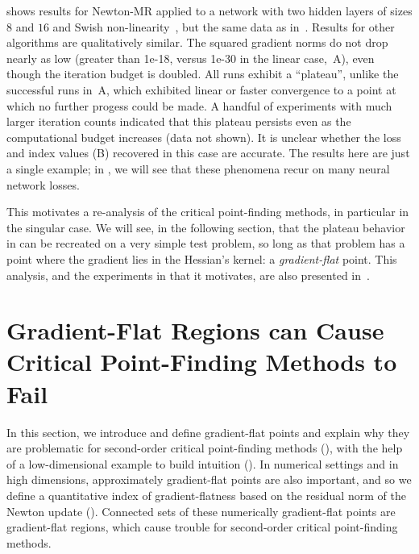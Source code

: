 \documentclass[../../thesis.tex]{subfiles}
\begin{document}
 shows
results for Newton-MR applied to
a network with two hidden layers of sizes $8$ and $16$
and Swish non-linearity~\cite{ramachandran2017},
but the same data as in~.
Results for other algorithms are qualitatively similar.
The squared gradient norms do not drop nearly as low
(greater than 1e-18, versus 1e-30
in the linear case,~A),
even though the iteration budget is doubled.
All runs exhibit a \enquote{plateau},
unlike the successful runs
in~A,
which exhibited linear or faster convergence
to a point at which no further progess could be made.
A handful of experiments with much larger iteration counts
indicated that this plateau persists even as the computational budget increases
(data not shown).
It is unclear whether the loss and index values
(B)
recovered in this case are accurate.
The results here are just a single example;
in ,
we will see that these phenomena recur on many neural network losses.

This motivates a re-analysis of the critical point-finding methods,
in particular in the singular case.
We will see, in the following section,
that the plateau behavior in 
can be recreated on a very simple test problem,
so long as that problem has a point where
the gradient lies in the Hessian's kernel:
a \emph{gradient-flat} point.
This analysis, and the experiments in
 that it motivates,
are also presented in~\cite{frye2020}.


\section{Gradient-Flat Regions can Cause Critical Point-Finding Methods to Fail}%

In this section,
we introduce and define gradient-flat points and
explain why they are problematic for second-order
critical point-finding methods
(),
with the help of a low-dimensional example
to build intuition
().
In numerical settings and in high dimensions,
approximately gradient-flat points are also important,
and so we define a quantitative index of gradient-flatness
based on the residual norm of the Newton update
().
Connected sets of these numerically gradient-flat points
are gradient-flat regions,
which cause trouble for
second-order critical point-finding methods.
\end{document}
